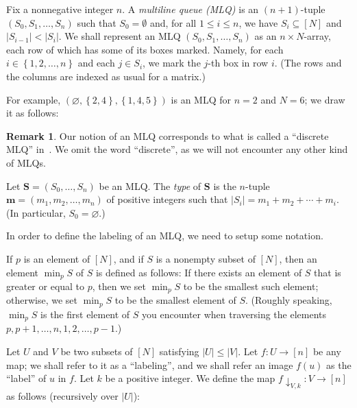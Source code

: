 \documentclass[reqno]{amsart}
\newcommand{\mm}{\mathbf{m}}
\newcommand{\MLQ}{\mathbf{S}}
\newcommand{\set}[1]{\left\{ #1 \right\}}
\newcommand{\abs}[1]{\left| #1 \right|}
\newcommand{\tup}[1]{\left( #1 \right)}
\newcommand{\ive}[1]{\left[ #1 \right]}
\newcommand{\mlnode}[1]{\node[circle, draw=black] at (#1){\phantom{c}};}
\newcommand{\defn}[1]{{\color{darkred}\emph{#1}}} %
\theoremstyle{plain}
\theoremstyle{definition}
\newtheorem{dfn}[thm]{Definition}
\newtheorem{remark}[thm]{Remark}
\numberwithin{equation}{section}
\begin{document}
Fix a nonnegative integer $n$.
A \defn{multiline queue (MLQ)} is an $(n+1)$-tuple $(S_0, S_1, \dotsc, S_n)$ such that $S_0 = \emptyset$ and, for all $1 \leq i \leq n$, we have $S_i \subseteq \ive{N}$ and $\lvert S_{i-1} \rvert < \lvert S_i \rvert$.
We shall represent an MLQ $\tup{S_0, S_1, \ldots, S_n}$ as an
$n \times N$-array, each row of which has some of its boxes
marked. Namely, for each $i \in \set{1, 2, \ldots, n}$ and
each $j \in S_i$, we mark the $j$-th box in row $i$.
(The rows and the columns are indexed as usual for a matrix.)

For example, $\tup{\varnothing, \set{2, 4}, \set{1, 4, 5}}$
is an MLQ for $n = 2$ and $N = 6$; we draw it as follows:
\scalebox{0.4}{
\begin{tikzpicture}
  \mlnode{2, 2}
  \mlnode{4, 2}
  \mlnode{1, 1}
  \mlnode{4, 1}
  \mlnode{5, 1}
\end{tikzpicture}
}

\begin{remark}
Our notion of an MLQ corresponds to what is called a ``discrete MLQ'' in~\cite[\S 2.2]{AasLin17}.
We omit the word ``discrete'', as we will not encounter any other kind of MLQs.
\end{remark}

Let $\MLQ = (S_0, \dotsc, S_n)$ be an MLQ.
The \defn{type} of $\MLQ$ is the  $n$-tuple $\mm = \tup{m_1, m_2, \ldots, m_n}$ of
positive
integers such that $\abs{S_i} = m_1 + m_2 + \cdots + m_i$.
(In particular, $S_0 = \varnothing$.)

In order to define the labeling of an MLQ, we need to setup some notation.

If $p$ is an element of $\ive{N}$,
and if $S$ is a nonempty subset of $\ive{N}$,
then an element $\min_p S$ of $S$ is defined as follows:
If there exists an element of $S$ that is greater
or equal to $p$, then we set $\min_p S$ to be the
smallest such element;
otherwise, we set $\min_p S$ to be the smallest
element of $S$.
(Roughly speaking, $\min_p S$ is the first element
of $S$ you encounter when traversing the elements
$p, p+1, \ldots, n, 1, 2, \ldots, p-1$.)

Let $U$ and $V$ be two subsets of $\ive{N}$ satisfying
$\abs{U} \leq \abs{V}$.
Let $f \colon U \to \ive{n}$ be any map; we shall
refer to it as a ``labeling'', and we shall refer an
image $f \tup{u}$ as the ``label'' of $u$ in $f$.
Let $k$ be a positive integer.
We define the map $f \downarrow_{V, k} : V \to \ive{n}$
as follows (recursively over $\abs{U}$):
\end{document}
